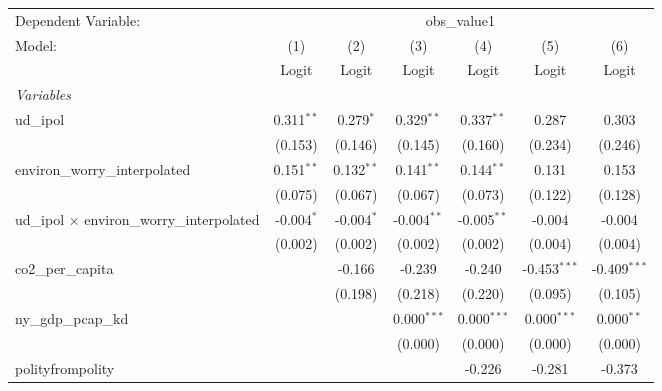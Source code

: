 
\begingroup
\centering
\begin{tabular}{lcccccc}
   \toprule
   Dependent Variable: & \multicolumn{6}{c}{obs\_value1}\\
   Model:                                             & (1)          & (2)          & (3)           & (4)           & (5)            & (6)\\  
                                                      &  Logit       & Logit        & Logit         & Logit         & Logit          & Logit\\  
   \midrule
   \emph{Variables}\\
   ud\_ipol                                           & 0.311$^{**}$ & 0.279$^{*}$  & 0.329$^{**}$  & 0.337$^{**}$  & 0.287          & 0.303\\   
                                                      & (0.153)      & (0.146)      & (0.145)       & (0.160)       & (0.234)        & (0.246)\\   
   environ\_worry\_interpolated                       & 0.151$^{**}$ & 0.132$^{**}$ & 0.141$^{**}$  & 0.144$^{**}$  & 0.131          & 0.153\\   
                                                      & (0.075)      & (0.067)      & (0.067)       & (0.073)       & (0.122)        & (0.128)\\   
   ud\_ipol $\times$ environ\_worry\_interpolated     & -0.004$^{*}$ & -0.004$^{*}$ & -0.004$^{**}$ & -0.005$^{**}$ & -0.004         & -0.004\\   
                                                      & (0.002)      & (0.002)      & (0.002)       & (0.002)       & (0.004)        & (0.004)\\   
   co2\_per\_capita                                   &              & -0.166       & -0.239        & -0.240        & -0.453$^{***}$ & -0.409$^{***}$\\   
                                                      &              & (0.198)      & (0.218)       & (0.220)       & (0.095)        & (0.105)\\   
   ny\_gdp\_pcap\_kd                                  &              &              & 0.000$^{***}$ & 0.000$^{***}$ & 0.000$^{***}$  & 0.000$^{**}$\\   
                                                      &              &              & (0.000)       & (0.000)       & (0.000)        & (0.000)\\   
   polityfrompolity                                   &              &              &               & -0.226        & -0.281         & -0.373\\   

\end{tabular}
